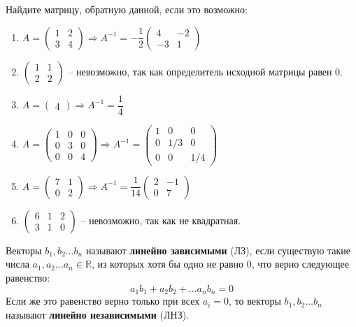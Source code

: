 \documentclass[11pt, a4paper]{extarticle}
\def \R{\mathbb{R}}
\begin{document}
Найдите матрицу, обратную данной, если это возможно:
	\begin{enumerate}[label=\alph*)]
		\item $A = \begin{pmatrix}
		1 & 2 \\
		3 & 4
		\end{pmatrix} \Rightarrow A^{-1} = -\dfrac{1}{2}\begin{pmatrix}
		4 & -2 \\
		-3 & 1
		\end{pmatrix} $
		\item $\begin{pmatrix}
		1 & 1 \\
		2 & 2
		\end{pmatrix}$ – невозможно, так как определитель исходной матрицы равен 0.
		\item $A = \begin{pmatrix}
		4
		\end{pmatrix} \Rightarrow A^{-1} = \dfrac{1}{4}$
		\item $A = \begin{pmatrix}
		1 & 0 & 0 \\
		0 & 3 & 0 \\
		0 & 0 & 4 
		\end{pmatrix} \Rightarrow A^{-1} = \begin{pmatrix}
		1 & 0 & 0 \\
		0 & 1/3 & 0 \\
		0 & 0 & 1/4 
		\end{pmatrix}$
		\item $A = \begin{pmatrix}
			7 & 1 \\
			0 & 2
		\end{pmatrix} \Rightarrow A^{-1} = \dfrac{1}{14}\begin{pmatrix}
		2 & -1 \\
		0 & 7
		\end{pmatrix}$
		\item $\begin{pmatrix}
			6 & 1 & 2 \\
			3 & 1 & 0
		\end{pmatrix}$ – невозможно, так как не квадратная.
	\end{enumerate}

Векторы $b_1, b_2 \ldots b_n$ называют \textbf{линейно зависимыми} (ЛЗ), если существую такие числа $a_1, a_2 \ldots a_n \in \R$, из которых хотя бы одно не равно 0, что верно следующее равенство:
\[
a_1b_1 + a_2b_2 + \ldots a_nb_n = 0
\]
Если же это равенство верно только при всех $a_i = 0$, то векторы $b_1, b_2 \ldots b_n$ называют \textbf{линейно независимыми} (ЛНЗ).
\end{document}

